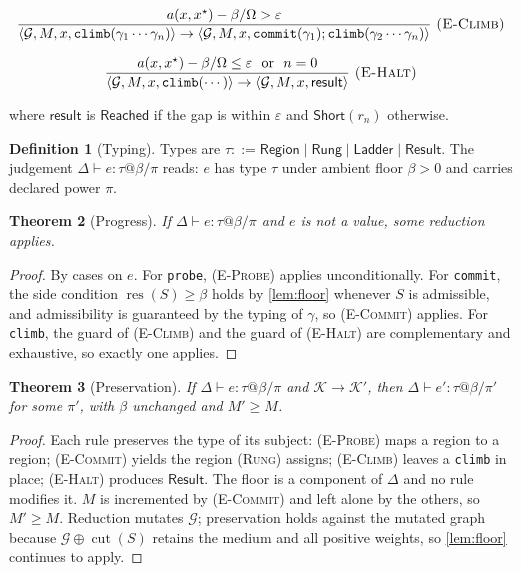 \documentclass[11pt,twocolumn,a4paper]{article}
\theoremstyle{plain}
\newtheorem{theorem}{Theorem}[section]
\theoremstyle{definition}
\newtheorem{definition}[theorem]{Definition}
\theoremstyle{remark}
\newcommand{\Gph}{\mathcal{G}}
\newcommand{\cut}{\operatorname{cut}}
\newcommand{\res}{\operatorname{res}}
\newcommand{\flo}{\beta}
\newcommand{\pow}{\pi}
\newcommand{\gap}{r}
\newcommand{\Tot}{\Omega}
\newcommand{\Rung}{\gamma}
\newcommand{\Conf}{\mathcal{K}}
\newcommand{\target}{x^{\star}}
\begin{document}
\[
\frac{a(x,\target) - \flo/\Tot > \varepsilon}
     {\langle \Gph, M, x, \texttt{climb}(\Rung_1\cdots\Rung_n)\rangle \to
      \langle \Gph, M, x, \texttt{commit}(\Rung_1);
              \texttt{climb}(\Rung_2\cdots\Rung_n)\rangle}
\ \textsc{(E-Climb)}
\]

\[
\frac{a(x,\target) - \flo/\Tot \leq \varepsilon \ \text{ or }\ n = 0}
     {\langle \Gph, M, x, \texttt{climb}(\cdots)\rangle \to
      \langle \Gph, M, x, \textsf{result}\rangle}
\ \textsc{(E-Halt)}
\]

where $\textsf{result}$ is $\textsf{Reached}$ if the gap is within $\varepsilon$
and $\textsf{Short}(\gap_n)$ otherwise.

\begin{definition}[Typing]
\label{def:typing}
Types are $\tau ::= \textsf{Region} \mid \textsf{Rung} \mid \textsf{Ladder}
\mid \textsf{Result}$. The judgement $\Delta \vdash e : \tau @ \flo / \pow$
reads: $e$ has type $\tau$ under ambient floor $\flo > 0$ and carries declared
power $\pow$.
\end{definition}

\begin{theorem}[Progress]
\label{thm:progress}
If $\Delta \vdash e : \tau @ \flo / \pow$ and $e$ is not a value, some reduction
applies.
\end{theorem}

\begin{proof}
By cases on $e$. For \texttt{probe}, \textsc{(E-Probe)} applies unconditionally.
For \texttt{commit}, the side condition $\res(S) \geq \flo$ holds by
\cref{lem:floor} whenever $S$ is admissible, and admissibility is guaranteed by
the typing of $\Rung$, so \textsc{(E-Commit)} applies. For \texttt{climb}, the
guard of \textsc{(E-Climb)} and the guard of \textsc{(E-Halt)} are complementary
and exhaustive, so exactly one applies.
\end{proof}

\begin{theorem}[Preservation]
\label{thm:preservation}
If $\Delta \vdash e : \tau @ \flo / \pow$ and
$\Conf \to \Conf'$, then $\Delta \vdash e' : \tau @ \flo / \pow'$ for some
$\pow'$, with $\flo$ unchanged and $M' \geq M$.
\end{theorem}

\begin{proof}
Each rule preserves the type of its subject: \textsc{(E-Probe)} maps a region to
a region; \textsc{(E-Commit)} yields the region \textsc{(Rung)} assigns;
\textsc{(E-Climb)} leaves a \texttt{climb} in place; \textsc{(E-Halt)} produces
$\textsf{Result}$. The floor is a component of $\Delta$ and no rule modifies it.
$M$ is incremented by \textsc{(E-Commit)} and left alone by the others, so
$M' \geq M$. Reduction mutates $\Gph$; preservation holds against the mutated
graph because $\Gph \oplus \cut(S)$ retains the medium and all positive weights,
so \cref{lem:floor} continues to apply.
\end{proof}
\end{document}
